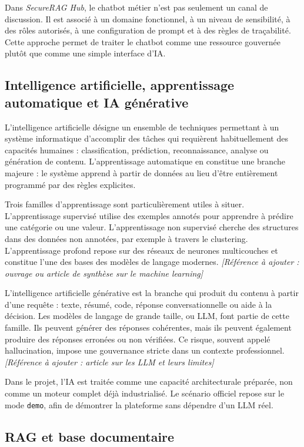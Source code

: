 Dans \textit{SecureRAG Hub}, le chatbot métier n'est pas seulement un canal de discussion. Il est associé à un domaine fonctionnel, à un niveau de sensibilité, à des rôles autorisés, à une configuration de prompt et à des règles de traçabilité. Cette approche permet de traiter le chatbot comme une ressource gouvernée plutôt que comme une simple interface d'IA.

\subsection{Intelligence artificielle, apprentissage automatique et IA générative}

L'intelligence artificielle désigne un ensemble de techniques permettant à un système informatique d'accomplir des tâches qui requièrent habituellement des capacités humaines : classification, prédiction, reconnaissance, analyse ou génération de contenu. L'apprentissage automatique en constitue une branche majeure : le système apprend à partir de données au lieu d'être entièrement programmé par des règles explicites.

Trois familles d'apprentissage sont particulièrement utiles à situer. L'apprentissage supervisé utilise des exemples annotés pour apprendre à prédire une catégorie ou une valeur. L'apprentissage non supervisé cherche des structures dans des données non annotées, par exemple à travers le clustering. L'apprentissage profond repose sur des réseaux de neurones multicouches et constitue l'une des bases des modèles de langage modernes. \textit{[Référence à ajouter : ouvrage ou article de synthèse sur le machine learning]}

L'intelligence artificielle générative est la branche qui produit du contenu à partir d'une requête : texte, résumé, code, réponse conversationnelle ou aide à la décision. Les modèles de langage de grande taille, ou LLM, font partie de cette famille. Ils peuvent générer des réponses cohérentes, mais ils peuvent également produire des réponses erronées ou non vérifiées. Ce risque, souvent appelé hallucination, impose une gouvernance stricte dans un contexte professionnel. \textit{[Référence à ajouter : article sur les LLM et leurs limites]}

Dans le projet, l'IA est traitée comme une capacité architecturale préparée, non comme un moteur complet déjà industrialisé. Le scénario officiel repose sur le mode \texttt{demo}, afin de démontrer la plateforme sans dépendre d'un LLM réel.

\subsection{RAG et base documentaire}

